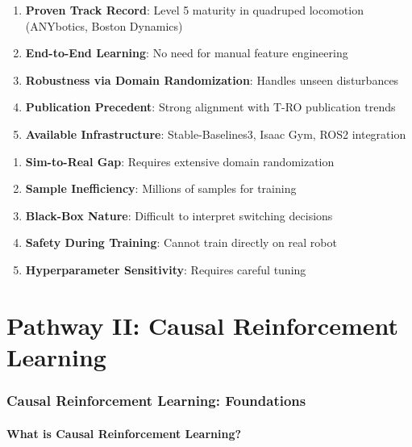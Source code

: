 \documentclass[11pt,a4paper]{article}
\begin{document}
\begin{drlbox}[Advantages]
\begin{enumerate}
  \item \textbf{Proven Track Record}: Level 5 maturity in quadruped locomotion (ANYbotics, Boston Dynamics)
  \item \textbf{End-to-End Learning}: No need for manual feature engineering
  \item \textbf{Robustness via Domain Randomization}: Handles unseen disturbances
  \item \textbf{Publication Precedent}: Strong alignment with T-RO publication trends
  \item \textbf{Available Infrastructure}: Stable-Baselines3, Isaac Gym, ROS2 integration
\end{enumerate}
\end{drlbox}

\begin{warningbox}[Challenges]
\begin{enumerate}
  \item \textbf{Sim-to-Real Gap}: Requires extensive domain randomization
  \item \textbf{Sample Inefficiency}: Millions of samples for training
  \item \textbf{Black-Box Nature}: Difficult to interpret switching decisions
  \item \textbf{Safety During Training}: Cannot train directly on real robot
  \item \textbf{Hyperparameter Sensitivity}: Requires careful tuning
\end{enumerate}
\end{warningbox}

\newpage
\part*{\textcolor{crlcolor}{Pathway II: Causal Reinforcement Learning}}

\section{Causal Reinforcement Learning: Foundations}

\subsection{What is Causal Reinforcement Learning?}
\end{document}
